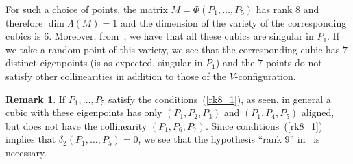 \documentclass{amsart}
\theoremstyle{plain}
\theoremstyle{definition}
\newtheorem{rmk}[lemma]{Remark}
\begin{document}
For such a choice
of points, the matrix $M = \Phi(P_1, \dots, P_5)$ has rank $8$
and therefore $\dim \Lambda(M) = 1$ and the dimension of the variety
of the corresponding cubics is $6$.
Moreover, from~, we have that all these cubics
are singular in $P_1$.
If we take a random point of this variety, we see that the corresponding
cubic has $7$ distinct eigenpoints (is as expected, singular in $P_1$) and the
$7$ points do not satisfy other collinearities in addition to those of the
$V$-configuration.

\begin{rmk}
\label{rmk:particular_cases}
If $P_1, \dots, P_5$ satisfy the conditions~(\ref{rk8_1}), as seen,
in general a cubic with these eigenpoints has only $(P_1, P_2, P_3)$ and $(P_1, P_4, P_5)$ aligned, but
does not have the collinearity $(P_1, P_6, P_7)$. Since conditions~(\ref{rk8_1})
implies that $\delta_2(P_1, \dots, P_5) = 0$, we see
that the hypothesis ``rank $9$''
in~ is necessary.
\end{rmk}
\end{document}
